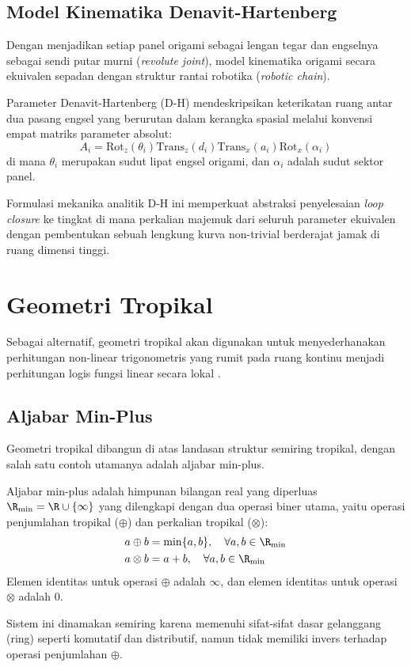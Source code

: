 \subsection{Model Kinematika Denavit-Hartenberg}
Dengan menjadikan setiap panel origami sebagai lengan tegar dan engselnya sebagai sendi putar murni (\textit{revolute joint}), model kinematika origami secara ekuivalen sepadan dengan struktur rantai robotika (\textit{robotic chain}). 
\begin{definisi}
  Parameter Denavit-Hartenberg (D-H) mendeskripsikan keterikatan ruang antar dua pasang engsel yang berurutan dalam kerangka spasial melalui konvensi empat matriks parameter absolut:
  \[
    A_i = \text{Rot}_z(\theta_i) \text{Trans}_z(d_i) \text{Trans}_x(a_i) \text{Rot}_x(\alpha_i)
  \]
  di mana $\theta_i$ merupakan sudut lipat engsel origami, dan $\alpha_i$ adalah sudut sektor panel.
\end{definisi}
Formulasi mekanika analitik D-H ini memperkuat abstraksi penyelesaian \textit{loop closure} ke tingkat di mana perkalian majemuk dari seluruh parameter ekuivalen dengan pembentukan sebuah lengkung kurva non-trivial berderajat jamak di ruang dimensi tinggi.

\section{Geometri Tropikal}
Sebagai alternatif, geometri tropikal akan digunakan untuk menyederhanakan perhitungan non-linear trigonometris yang rumit pada ruang kontinu menjadi perhitungan logis fungsi linear secara lokal \parencite{mikhalkin2006tropical}.

\subsection{Aljabar Min-Plus}
Geometri tropikal dibangun di atas landasan struktur semiring tropikal, dengan salah satu contoh utamanya adalah aljabar min-plus.
\begin{definisi}
  Aljabar min-plus adalah himpunan bilangan real yang diperluas $\R_{\min} = \R \cup \{\infty\}$ yang dilengkapi dengan dua operasi biner utama, yaitu operasi penjumlahan tropikal ($\oplus$) dan perkalian tropikal ($\otimes$):
  \begin{align*}
    a \oplus b  & = \min\{a, b\}, \quad \forall a, b \in \R_{\min} \\
    a \otimes b & = a + b, \quad \forall a, b \in \R_{\min}
  \end{align*}
  Elemen identitas untuk operasi $\oplus$ adalah $\infty$, dan elemen identitas untuk operasi $\otimes$ adalah $0$.
\end{definisi}
Sistem ini dinamakan semiring karena memenuhi sifat-sifat dasar gelanggang (ring) seperti komutatif dan distributif, namun tidak memiliki invers terhadap operasi penjumlahan $\oplus$.

